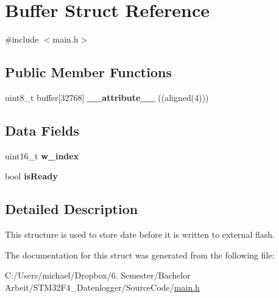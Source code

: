 \hypertarget{struct_buffer}{}\section{Buffer Struct Reference}
\label{struct_buffer}


{\ttfamily \#include $<$main.\+h$>$}

\subsection*{Public Member Functions}
\begin{DoxyCompactItemize}
\item 
\hypertarget{group__main_ga818acd0ef479ded56084cebbfb8b1136}{}uint8\+\_\+t buffer\mbox{[}32768\mbox{]} {\bfseries \+\_\+\+\_\+attribute\+\_\+\+\_\+} ((aligned(4)))\label{group__main_ga818acd0ef479ded56084cebbfb8b1136}

\end{DoxyCompactItemize}
\subsection*{Data Fields}
\begin{DoxyCompactItemize}
\item 
\hypertarget{group__main_ga5f56222f10a6cb328eaf759e2795117c}{}uint16\+\_\+t {\bfseries w\+\_\+index}\label{group__main_ga5f56222f10a6cb328eaf759e2795117c}

\item 
\hypertarget{group__main_ga1f1586f3013bbd3b99be7275eec73e76}{}bool {\bfseries is\+Ready}\label{group__main_ga1f1586f3013bbd3b99be7275eec73e76}

\end{DoxyCompactItemize}


\subsection{Detailed Description}
This structure is used to store date before it is written to external flash. 

The documentation for this struct was generated from the following file\+:\begin{DoxyCompactItemize}
\item 
C\+:/\+Users/michael/\+Dropbox/6. Semester/\+Bachelor Arbeit/\+S\+T\+M32\+F4\+\_\+\+Datenlogger/\+Source\+Code/\hyperlink{main_8h}{main.\+h}\end{DoxyCompactItemize}
